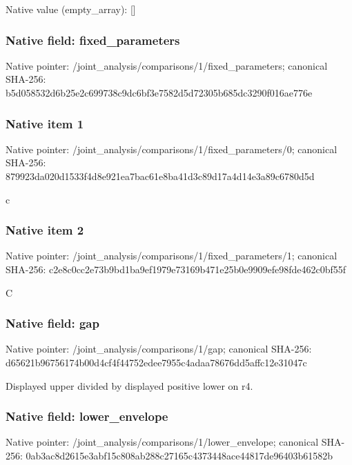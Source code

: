 \documentclass[10pt,a4paper]{article}
\begin{document}
Native value (empty\_\allowbreak{}array): []

\subsubsection{Native field: fixed\_\allowbreak{}parameters}
Native pointer: /joint\_\allowbreak{}analysis/comparisons/1/fixed\_\allowbreak{}parameters; canonical SHA-256: b5d058532d6b25e2c699738c9dc6bf3e7582d5d72305b685dc3290f016ae776e

\subsubsection{Native item 1}
Native pointer: /joint\_\allowbreak{}analysis/comparisons/1/fixed\_\allowbreak{}parameters/0; canonical SHA-256: 879923da020d1533f4d8e921ea7bac61e8ba41d3c89d17a4d14e3a89c6780d5d

\begingroup\raggedright\sloppy c\par\endgroup

\subsubsection{Native item 2}
Native pointer: /joint\_\allowbreak{}analysis/comparisons/1/fixed\_\allowbreak{}parameters/1; canonical SHA-256: c2e8c0cc2e73b9bd1ba9ef1979e73169b471e25b0e9909efe98fde462c0bf55f

\begingroup\raggedright\sloppy C\par\endgroup

\subsubsection{Native field: gap}
Native pointer: /joint\_\allowbreak{}analysis/comparisons/1/gap; canonical SHA-256: d65621b96756174b00d4cf4f44752edee7955c4adaa78676dd5affc12e31047c

\begingroup\raggedright\sloppy Displayed upper divided by displayed positive lower on r4.\par\endgroup

\subsubsection{Native field: lower\_\allowbreak{}envelope}
Native pointer: /joint\_\allowbreak{}analysis/comparisons/1/lower\_\allowbreak{}envelope; canonical SHA-256: 0ab3ac8d2615e3abf15c808ab288c27165c4373448ace44817de96403b61582b
\end{document}
